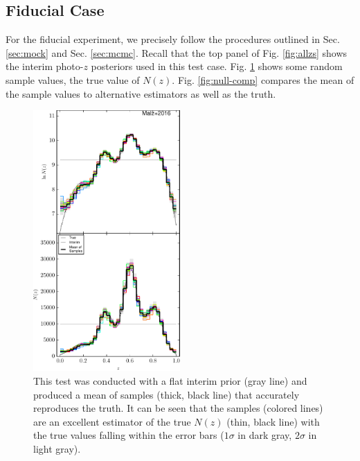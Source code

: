 \documentclass[preprint]{aastex}
\begin{document}
\subsection{Fiducial Case}
\label{sec:null}

For the fiducial experiment, we precisely follow the procedures outlined in 
Sec. \ref{sec:mock} and Sec. \ref{sec:mcmc}.  Recall that the top panel of Fig. 
\ref{fig:allzs} shows the interim photo-$z$ posteriors used in this test case.  
Fig. \ref{fig:null-samp} shows some random sample values, the true value of 
$N(z)$.  Fig. \ref{fig:null-comp} compares the mean of the sample values to 
alternative estimators as well as the truth.

\begin{figure}
\includegraphics[width=0.5\textwidth]{figs/null/samps.pdf}
\caption{This test was conducted with a flat interim prior (gray line) and 
produced a mean of samples (thick, black line) that accurately reproduces the 
truth.  It can be seen that the samples (colored lines) are an excellent 
estimator of the true $N(z)$ (thin, black line) with the true values falling 
within the error bars ($1\sigma$ in dark gray, $2\sigma$ in light gray).}
\label{fig:null-samp}
\end{figure}
\end{document}
